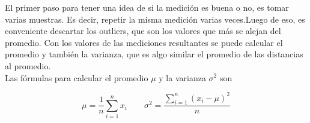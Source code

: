 \documentclass[10pt,a4paper,spanish]{article}
\begin{document}
El primer paso para tener una idea de si la medición es buena o no, es tomar varias muestras. Es decir, repetir la misma medición varias veces.Luego de eso, es conveniente descartar los outliers, que son los valores que más se alejan del promedio. Con los valores de las mediciones resultantes se puede calcular el promedio y también la varianza, que es algo similar el promedio de las distancias al promedio. \\

Las fórmulas para calcular el promedio $\mu$ y la varianza $\sigma^2$ son

$$
\mu = \frac{1}{n}\sum_{i=1}^{n} x_i \qquad \sigma^2 = \frac{\displaystyle\sum_{i=1}^{n}(x_i - \mu)^2} {n}
$$







\end{document}
